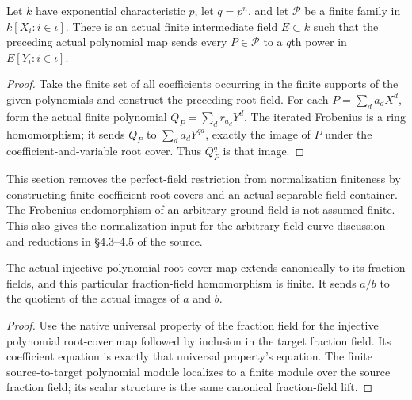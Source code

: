 \begin{lemma}
\label{lem:normalization-finite-polynomial-family-roots}
\leanok
Let $k$ have exponential characteristic $p$, let $q=p^n$, and let
$\mathcal P$ be a finite family in $k[X_i:i\in\iota]$. There is an
actual finite intermediate field $E\subset\overline k$ such that the
preceding actual polynomial map sends every $P\in\mathcal P$ to a
$q$th power in $E[Y_i:i\in\iota]$.
\end{lemma}
\begin{proof}
Take the finite set of all coefficients occurring in the finite supports
of the given polynomials and construct the preceding root field. For
each $P=\sum_d a_dX^d$, form the actual finite polynomial
$Q_P=\sum_d r_{a_d}Y^d$. The iterated Frobenius is a ring homomorphism;
it sends $Q_P$ to $\sum_da_dY^{qd}$, exactly the image of $P$ under the
coefficient-and-variable root cover. Thus $Q_P^q$ is that image.
\end{proof}

\endgroup

\begingroup

This section removes the perfect-field restriction from normalization
finiteness by constructing finite coefficient-root covers and an actual
separable field container. The Frobenius endomorphism of an arbitrary
ground field is not assumed finite. This also gives the normalization
input for the arbitrary-field curve discussion and reductions in
\S4.3--4.5 of the source.

\begin{lemma}
\label{lem:normalization-finite-root-fraction-extension}
\leanok
The actual injective polynomial root-cover map extends canonically to
its fraction fields, and this particular fraction-field homomorphism
is finite. It sends $a/b$ to the quotient of the actual images of
$a$ and $b$.
\end{lemma}
\begin{proof}
Use the native universal property of the fraction field for the
injective polynomial root-cover map followed by inclusion in the
target fraction field. Its coefficient equation is exactly that
universal property's equation. The finite source-to-target polynomial
module localizes to a finite module over the source fraction field;
its scalar structure is the same canonical fraction-field lift.
\end{proof}

